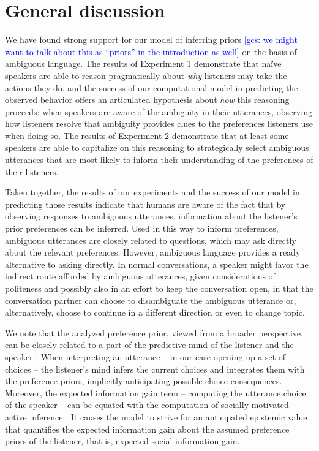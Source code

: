 \documentclass[10pt,a4paper]{article}
\newcommand{\gcs}[1]{\textcolor{blue}{[gcs: #1]}}
\begin{document}
\section{General discussion}

We have found strong support for our model of inferring priors \gcs{we might want to talk about this as ``priors'' in the introduction as well} on the basis of ambiguous language.
The results of Experiment 1 demonstrate that na\"ive speakers are able to reason pragmatically about \emph{why} listeners may take the actions they do, and the success of our computational model in predicting the observed behavior offers an articulated hypothesis about \emph{how} this reasoning proceeds: when speakers are aware of the ambiguity in their utterances, observing how listeners resolve that ambiguity provides clues to the preferences listeners use when doing so.
The results of Experiment 2 demonstrate that at least some speakers are able to capitalize on this reasoning to strategically select ambiguous utterances that are most likely to inform their understanding of the preferences of their listeners.

Taken together, the results of our experiments and the success of our model in predicting those results indicate that humans are aware of the fact that by observing responses to ambiguous utterances, information about the listener's prior preferences can be inferred. 
Used in this way to inform preferences, ambiguous utterances are closely related to questions, which may ask directly about the  relevant preferences. 
However, ambiguous language provides a ready alternative to asking directly. In normal conversations, a speaker might favor the indirect route afforded by ambiguous utterances, given considerations of politeness and possibly also in an effort to keep the conversation open, in that the conversation partner can choose to disambiguate the ambiguous utterance or, alternatively, choose to continue in a different direction or even to change topic.


We note that the analyzed preference prior, viewed from a broader perspective, can be closely related to a part of the predictive mind of the listener and the speaker \cite{Butz:2016,Butz:2017}. 
When interpreting an utterance -- in our case opening up a set of choices -- the listener's mind infers the current choices and integrates them with the preference priors, implicitly anticipating possible choice consequences.
Moreover, the expected information gain term -- computing the utterance choice of the speaker -- can be equated with the computation of socially-motivated active inference \cite{Butz:2017a,Friston:2015}.
It causes the model to strive for an anticipated epistemic value that quantifies the expected information gain about the assumed preference priors of the listener, that is, expected social information gain. 
\end{document}
